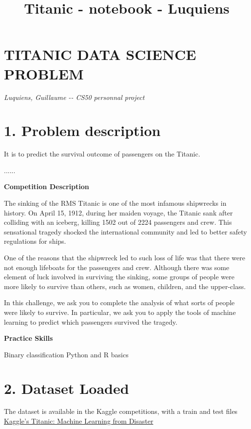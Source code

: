 \documentclass[11pt]{article}
\title{Titanic - notebook - Luquiens}
\begin{document}
    
    
    \maketitle
    
    

    
    \section{TITANIC DATA SCIENCE
PROBLEM}\label{titanic-data-science-problem}

\emph{Luquiens, Guillaume -\/- CS50 personnal project}

    \section{1. Problem description}\label{problem-description}

It is to predict the survival outcome of passengers on the Titanic.

......

\textbf{Competition Description}

The sinking of the RMS Titanic is one of the most infamous shipwrecks in
history. On April 15, 1912, during her maiden voyage, the Titanic sank
after colliding with an iceberg, killing 1502 out of 2224 passengers and
crew. This sensational tragedy shocked the international community and
led to better safety regulations for ships.

One of the reasons that the shipwreck led to such loss of life was that
there were not enough lifeboats for the passengers and crew. Although
there was some element of luck involved in surviving the sinking, some
groups of people were more likely to survive than others, such as women,
children, and the upper-class.

In this challenge, we ask you to complete the analysis of what sorts of
people were likely to survive. In particular, we ask you to apply the
tools of machine learning to predict which passengers survived the
tragedy.

\textbf{Practice Skills}

Binary classification Python and R basics

    \section{2. Dataset Loaded}\label{dataset-loaded}

The dataset is available in the Kaggle competitions, with a train and
test files \href{https://www.kaggle.com/c/titanic/data}{Kaggle's
Titanic: Machine Learning from Disaster}
\end{document}

